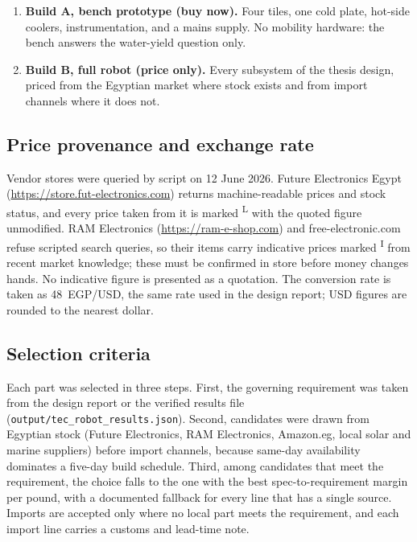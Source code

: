 \documentclass[11pt,a4paper]{article}
\newcommand{\liveflag}{\textsuperscript{L}}
\newcommand{\indflag}{\textsuperscript{I}}
\begin{document}
\begin{enumerate}[nosep]
  \item \textbf{Build A, bench prototype (buy now).} Four tiles, one cold
        plate, hot-side coolers, instrumentation, and a mains supply. No
        mobility hardware: the bench answers the water-yield question only.
  \item \textbf{Build B, full robot (price only).} Every subsystem of the
        thesis design, priced from the Egyptian market where stock exists
        and from import channels where it does not.
\end{enumerate}

\subsection{Price provenance and exchange rate}
Vendor stores were queried by script on 12 June 2026. Future Electronics
Egypt (\url{https://store.fut-electronics.com}) returns machine-readable
prices and stock status, and every price taken from it is marked
\liveflag{} with the quoted figure unmodified. RAM Electronics
(\url{https://ram-e-shop.com}) and free-electronic.com refuse scripted
search queries, so their items carry indicative prices marked \indflag{}
from recent market knowledge; these must be confirmed in store before money
changes hands. No indicative figure is presented as a quotation. The
conversion rate is taken as \num{48}~EGP/USD, the same rate used in the
design report; USD figures are rounded to the nearest dollar.

\subsection{Selection criteria}
Each part was selected in three steps. First, the governing requirement was
taken from the design report or the verified results file
(\texttt{output/tec\_robot\_results.json}). Second, candidates were drawn
from Egyptian stock (Future Electronics, RAM Electronics, Amazon.eg, local
solar and marine suppliers) before import channels, because same-day
availability dominates a five-day build schedule. Third, among candidates
that meet the requirement, the choice falls to the one with the best
spec-to-requirement margin per pound, with a documented fallback for every
line that has a single source. Imports are accepted only where no local part
meets the requirement, and each import line carries a customs and lead-time
note.

\end{document}
